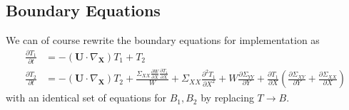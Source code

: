 \documentclass[12pt,a4paper]{article}
\newcommand{\p}{\partial}
\newcommand{\bU}{\mathbf{U}}
\newcommand{\bX}{\mathbf{X}}
\begin{document}
\subsection{Boundary Equations}
We can of course rewrite the boundary equations for implementation as
\begin{align}
    \frac{\p T_1}{\p t} &= -\left(\bU \cdot \nabla_{\bX}\right)T_1 + T_2\\
    \frac{\p T_2}{\p t} &= -\left(\bU \cdot \nabla_{\bX}\right)T_2 + \frac{\Sigma_{XX}\frac{\p W}{\p X}\frac{\p T_1}{\p X}}{W} + \Sigma_{XX}\frac{\p^2 T_1}{\p X^2} + W\frac{\p \Sigma_{YY}}{\p Y} + \frac{\p T_1}{\p X}\left(\frac{\p \Sigma_{XY}}{\p Y} + \frac{\p \Sigma_{XX}}{\p X}\right)
\end{align}
with an identical set of equations for $B_1, B_2$ by replacing $T \rightarrow B$.
\end{document}
